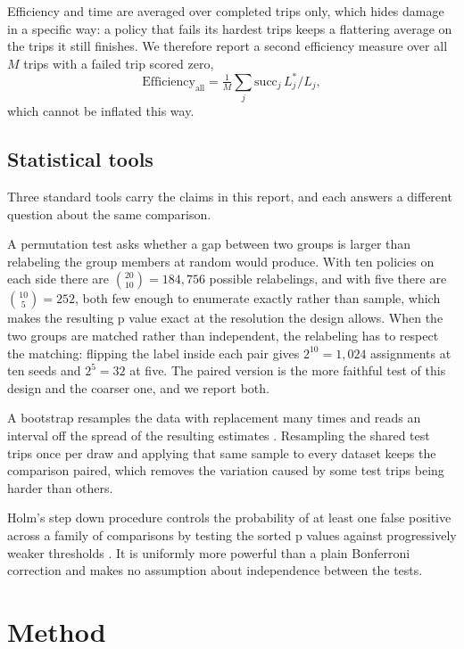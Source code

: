 \documentclass[conference]{IEEEtran}
\begin{document}
Efficiency and time are averaged over completed trips only, which hides damage in a specific way: a policy that
fails its hardest trips keeps a flattering average on the trips it still finishes. We therefore report a second
efficiency measure over all $M$ trips with a failed trip scored zero,
\begin{equation}
\text{Efficiency}_{\text{all}}=\tfrac{1}{M}\textstyle\sum_j \text{succ}_j\, L^*_j/L_j ,
\label{eq:effall}
\end{equation}
which cannot be inflated this way.

\subsection{Statistical tools}\label{sec:tools}
Three standard tools carry the claims in this report, and each answers a different question about the same
comparison.

A permutation test asks whether a gap between two groups is larger than relabeling the group members at random
would produce. With ten policies on each side there are $\binom{20}{10}=184{,}756$ possible relabelings, and
with five there are $\binom{10}{5}=252$, both few enough to enumerate exactly rather than sample, which makes
the resulting p value exact at the resolution the design allows. When the two groups are matched rather than
independent, the relabeling has to respect the matching: flipping the label inside each pair gives $2^{10}=1{,}024$
assignments at ten seeds and $2^5=32$ at five. The paired version is the more faithful test of this design and
the coarser one, and we report both.

A bootstrap resamples the data with replacement many times and reads an interval off the spread of the resulting
estimates \cite{efron}. Resampling the shared test trips once per draw and applying that same sample to every
dataset keeps the comparison paired, which removes the variation caused by some test trips being harder than
others.

Holm's step down procedure controls the probability of at least one false positive across a family of
comparisons by testing the sorted p values against progressively weaker thresholds \cite{holm}. It is uniformly
more powerful than a plain Bonferroni correction and makes no assumption about independence between the tests.

\section{Method}
\end{document}
